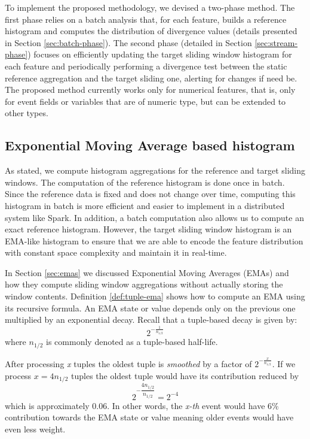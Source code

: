 To implement the proposed methodology, we devised a two-phase method. The first phase relies on a batch analysis that, for each feature, builds a reference histogram and computes the distribution of divergence values (details presented in Section \ref{sec:batch-phase}). The second phase (detailed in Section \ref{sec:stream-phase}) focuses on efficiently updating the target sliding window histogram for each feature and periodically performing a divergence test between the static reference aggregation and the target sliding one, alerting for changes if need be. The proposed method currently works only for numerical features, that is, only for event fields or variables that are of numeric type, but can be extended to other types.


\subsection{Exponential Moving Average based histogram} \label{sec:ema-hist}
As stated, we compute histogram aggregations for the reference and target sliding windows. The computation of the reference histogram is done once in batch. Since the reference data is fixed and does not change over time, computing this histogram in batch is more efficient and easier to implement in a distributed system like Spark. In addition, a batch computation also allows us to compute an exact reference histogram. However, the target sliding window histogram is an EMA-like histogram to ensure that we are able to encode the feature distribution with constant space complexity and maintain it in real-time.

In Section \ref{sec:emas} we discussed Exponential Moving Averages (EMAs) and how they compute sliding window aggregations without actually storing the window contents. Definition \ref{def:tuple-ema} shows how to compute an EMA using its recursive formula. An EMA state or value depends only on the previous one multiplied by an exponential decay. Recall that a tuple-based decay is given by:
\[ 2^{- \frac{1}{n_{1/2}}} \]
where $n_{1/2}$ is commonly denoted as a tuple-based half-life. 


After processing \textit{x} tuples the oldest tuple is \emph{smoothed} by a factor of $2^{- \frac{x}{n_{1/2}}}$. If we process $x = 4n_{1/2}$ tuples the oldest tuple would have its contribution reduced by
\[ 2^{- \dfrac{4n_{1/2}}{n_{1/2}}} = 2^{-4} \]
which is approximately 0.06. In other words, the \textit{x-th} event would have 6\% contribution towards the EMA state or value meaning older events would have even less weight.

